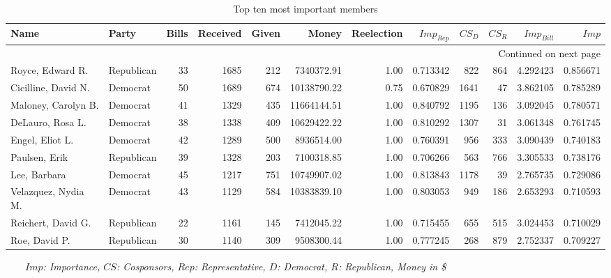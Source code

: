 \begin{longtable}{llrrrrrrrrrr}
\caption{Top ten most important members}\\
\toprule
                Name &       Party &  Bills &  Received &  Given &        Money &  Reelection &  $Imp_{Rep}$ &    $CS_{D}$ &   $CS_{R}$ &  $Imp_{Bill}$ &       $Imp$ \\
\midrule
\endhead
\midrule
\multicolumn{12}{r}{{Continued on next page}} \\
\midrule
\endfoot

\bottomrule
\endlastfoot
Royce, Edward R. &  Republican &     33 &      1685 &    212 &   7340372.91 &        1.00 &   0.713342 &   822 &   864 &    4.292423 &  0.856671 \\
Cicilline, David N. &    Democrat &     50 &      1689 &    674 &  10138790.22 &        0.75 &   0.670829 &  1641 &    47 &    3.862105 &  0.785289 \\
Maloney, Carolyn B. &    Democrat &     41 &      1329 &    435 &  11664144.51 &        1.00 &   0.840792 &  1195 &   136 &    3.092045 &  0.780571 \\
DeLauro, Rosa L. &    Democrat &     38 &      1338 &    409 &  10629422.22 &        1.00 &   0.810292 &  1307 &    31 &    3.061348 &  0.761745 \\
Engel, Eliot L. &    Democrat &     42 &      1289 &    500 &   8936514.00 &        1.00 &   0.760391 &   956 &   333 &    3.090439 &  0.740183 \\
Paulsen, Erik &  Republican &     39 &      1328 &    203 &   7100318.85 &        1.00 &   0.706266 &   563 &   766 &    3.305533 &  0.738176 \\
Lee, Barbara &    Democrat &     45 &      1217 &    751 &  10749907.02 &        1.00 &   0.813843 &  1178 &    39 &    2.765735 &  0.729086 \\
Velazquez, Nydia M. &    Democrat &     43 &      1129 &    584 &  10383839.10 &        1.00 &   0.803053 &   949 &   186 &    2.653293 &  0.710593 \\
Reichert, David G. &  Republican &     22 &      1161 &    145 &   7412045.22 &        1.00 &   0.715455 &   655 &   515 &    3.024453 &  0.710029 \\
Roe, David P. &  Republican &     30 &      1140 &    309 &   9508300.44 &        1.00 &   0.777245 &   268 &   879 &    2.752337 &  0.709227 \\
\end{longtable}

\textit{$\qquad Imp$: Importance, $CS$: Cosponsors, $Rep$: Representative, $D$: Democrat, $R$: Republican, Money in \$}
